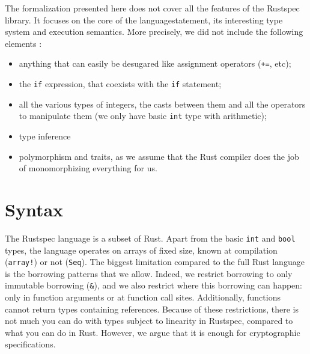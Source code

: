 \documentclass[11pt,a4paper]{article}
\newcommand{\rustspec}{\textsf{Rustspec}}
\newcommand{\syntext}[1]{\texttt{#1}}
\newcommand{\synkeyword}[1]{\textcolor{red!60!black}{\syntext{#1}}}
\newcommand{\synpunct}[1]{\textcolor{black!40!white}{\texttt{#1}}}
\newcommand{\synbool}{\synkeyword{bool}}
\newcommand{\synint}{\synkeyword{int}}
\newcommand{\synseq}{\syntext{Seq}}
\newcommand{\synif}{\synkeyword{if}\;}
\newcommand{\synarraymacro}{\synkeyword{array!}}
\newcommand{\synref}{\synpunct{\&}}
\begin{document}
The formalization presented here does not cover all the features of the \rustspec{} library. It
focuses on the core of the languagestatement, its interesting type system and execution semantics. More
precisely, we did not include the following elements :
\begin{itemize}
	\item anything that can easily be desugared like assignment operators (\synpunct{+=}, etc);
	\item the \synif{} expression, that coexists with the \synif{} statement;
	\item all the various types of integers, the casts between them and all the operators to
	      manipulate them (we only have basic \synint{} type with arithmetic);
	\item type inference
	\item polymorphism and traits, as we assume that the Rust compiler does the job of monomorphizing
	      everything for us.
\end{itemize}

\section{Syntax}

The \rustspec{} language is a subset of Rust. Apart from the basic \synint{} and \synbool{} types,
the language operates on arrays of fixed size, known at compilation (\synarraymacro{}) or not
(\synseq). The biggest limitation compared to the full Rust language is the borrowing patterns
that we allow. Indeed, we restrict borrowing to only immutable borrowing (\synref{}),
and we also restrict where this borrowing can happen: only in function arguments or at function call
sites. Additionally, functions cannot return types containing references. Because of these restrictions,
there is not much you can do with types subject to linearity in \rustspec, compared to what you
can do in Rust. However, we argue that it is enough for cryptographic specifications.
\end{document}
